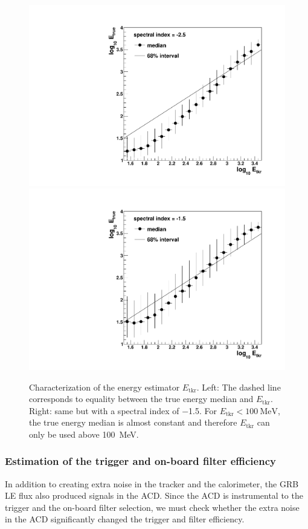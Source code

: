 \documentclass[preprint]{aastex631}
\begin{document}
\begin{figure}[t]
    \centering
    \includegraphics[width=0.45\linewidth]{paper_MClogEtkr_index-2p5.pdf}
    \includegraphics[width=0.45\linewidth]{paper_MClogEtkr_index-1p5.pdf}    \caption{Characterization of the energy estimator $E_\mathrm{tkr}$. Left:  The dashed line corresponds to equality between the true energy median and $E_\mathrm{tkr}$. Right: same but with a spectral index of $-$1.5. For $E_\mathrm{tkr}<100~\mathrm{MeV}$, the true energy median is almost constant and therefore $E_\mathrm{tkr}$ can only be used above 100~MeV.}
    \label{fig:MClogEtkr}
\end{figure}

\subsubsection{Estimation of the trigger and on-board filter efficiency}
\label{sec:Limb_efficiency}

In addition to creating extra noise in the tracker and the calorimeter, the GRB LE flux also produced signals in the ACD. Since the ACD is instrumental to the trigger and the on-board filter selection, we must check whether the extra noise in the ACD significantly changed the trigger and filter efficiency.
\end{document}

